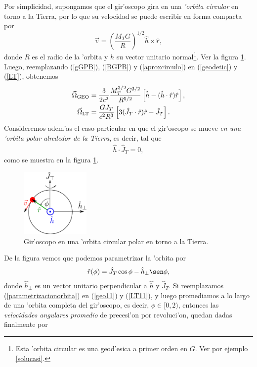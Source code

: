 Por simplicidad, supongamos que el gir'oscopo gira en una \textit{'orbita circular} en torno a la Tierra, por lo que su velocidad se puede escribir en forma compacta por
\begin{equation}
\vec{v}=\left(\frac{M_TG}{R}\right)^{1/2}\hat{h}\times\hat{r},\label{aproxcirculo}
\end{equation}
donde $R$ es el radio de la 'orbita y $\hat{h}$ su vector unitario normal\footnote{Esta 'orbita circular es una geod'esica a primer orden en $G$. Ver por ejemplo \eqref{solucasi}.}. Ver la figura \ref{orbitaGPB}. Luego, reemplazando (\ref{gGPB}), (\ref{BGPB}) y (\ref{aproxcirculo}) en (\ref{geodetic}) y (\ref{LT}), obtenemos
\begin{align}
\vec{\Omega}_{\rm GEO}={}&\frac{3}{2c^2}\frac{M_T^{3/2}G^{3/2}}{R^{5/2}}\left[\hat{h}-(\hat{h}\cdot\hat{r})\hat{r}\right],\label{geo11}\\
\vec{\Omega}_{\rm LT}={}&\frac{GJ_T}{c^2R^3}\left[3(\hat{J}_T\cdot\hat{r})\hat{r}-\hat{J}_T\right].\label{LT11}
\end{align}
Consideremos adem'as el caso particular en que el gir'oscopo se mueve \textit{en una 'orbita polar alrededor de la Tierra}, es decir, tal que
\begin{align}
\hat{h}\cdot\hat{J}_T=0,
\end{align}
como se muestra en la figura \ref{orbitaGPB}.
\begin{figure}[H]
\centering
\includegraphics[angle=0,width=0.3\textwidth]{fig/fig-orbitaGPB.pdf}
\caption{Gir'oscopo en una 'orbita circular polar en torno a la Tierra.}
\label{orbitaGPB}
\end{figure}
De la figura vemos que podemos parametrizar la 'orbita por
\begin{align}
\hat{r}(\phi)=\hat{J}_T\cos\phi-\hat{h}_{\perp}\sen\phi,\label{parametrizacionorbita}
\end{align}
donde $\hat{h}_{\perp}$ es un vector unitario perpendicular a $\hat{h}$ y $\hat{J}_T$. Si reemplazamos (\ref{parametrizacionorbita}) en (\ref{geo11}) y (\ref{LT11}), y luego promediamos a lo largo de una 'orbita completa del gir'oscopo, es decir, $\phi\in[0,2)$, entonces las \emph{velocidades angulares promedio} de precesi'on por revoluci'on, quedan dadas finalmente por
